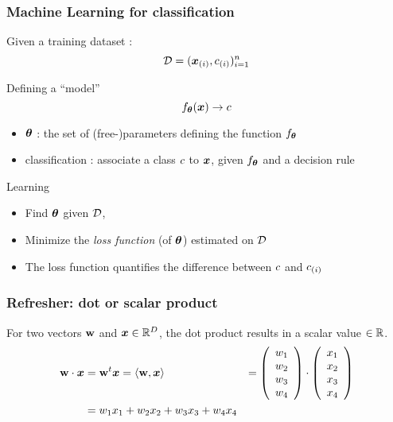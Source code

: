 \begin{frame}
  \frametitle{Machine Learning for classification}
   Given a training dataset : 
   $$\mathcal{D} = (\boldsymbol{x}_{(i)},{c}_{(i)})_{i=1}^n$$

   \begin{block}{Defining a ``model''}
     $$ f_{\boldsymbol{\theta}}(\boldsymbol{x})  \rightarrow {c} $$
     \begin{itemize}
     \item $\boldsymbol{\theta}$ : the set of (free-)parameters defining the 
       function $f_{\boldsymbol{\theta}}$ 
     \item classification : associate a class ${c}$ to $\boldsymbol{x}$, given
       $f_{\boldsymbol{\theta}}$ and a decision rule
     \end{itemize}
   \end{block}

   \begin{block}{Learning}
     \begin{itemize}
     \item Find $\boldsymbol{\theta}$ given  $\mathcal{D}$, 
     \item Minimize the \textit{loss function} (of $\boldsymbol{\theta}$)
       estimated on $\mathcal{D}$
     \item The loss function quantifies the difference between
       ${c}$ and ${c}_{(i)}$
     \end{itemize}
   \end{block}
\end{frame}


\begin{frame}
  \frametitle{Refresher: dot or scalar product}
  For two vectors $\mathbf{w}$ and $\boldsymbol{x} \in \mathbb{R}^{D}$, the dot product results in a scalar value $\in \mathbb{R}$.
  \begin{align*}
    \vct{w}\cdot\x &=  \scal{\vct{w}}{\x}  = \left\langle \vct{w} , \x \right\rangle %
                   &= \left( \begin{array}{c} w_{1}\\ w_{2} \\ w_{3} \\ w_{4} \end{array} \right) %
    \cdot\left( \begin{array}{c} x_{1}\\ x_{2} \\ x_{3} \\ x_{4} \end{array} \right) \\%
    &= w_{1}x_{1} + w_{2}x_{2} + w_{3}x_{3} + w_{4}x_{4}
  \end{align*}
\end{frame}

